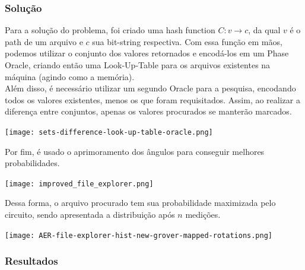 \documentclass{article}
\begin{document}
\newpage

\subsubsection{Solução}

Para a solução do problema, foi criado uma hash function $C: v \to c$, da qual $v$ é o path de um arquivo e $c$ sua bit-string respectiva. Com essa função em mãos, podemos utilizar o conjunto dos valores retornados e encodá-los em um Phase Oracle, criando então uma Look-Up-Table para os arquivos existentes na máquina (agindo como a memória).\\
Além disso, é necessário utilizar um segundo Oracle para a pesquisa, encodando todos os valores existentes, menos os que foram requisitados. Assim, ao realizar a diferença entre conjuntos, apenas os valores procurados se manterão marcados.

\begin{center}
	\texttt{[image: sets-difference-look-up-table-oracle.png]}
	\label{fig:luts}
\end{center}


Por fim, é usado o aprimoramento dos ângulos para conseguir melhores probabilidades.

\begin{center}
	\texttt{[image: improved\_file\_explorer.png]}
	\label{fig:file-explorer}
\end{center}

Dessa forma, o arquivo procurado tem sua probabilidade maximizada pelo circuito, sendo apresentada a distribuição após $n$ medições.

\begin{center}
	\texttt{[image: AER-file-explorer-hist-new-grover-mapped-rotations.png]}
	\label{fig:file-explorer-hist}
\end{center}

\newpage

\subsubsection{Resultados}
\end{document}
